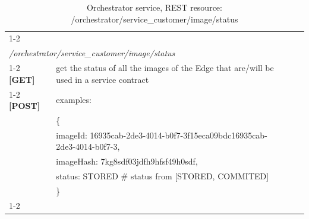 \begin{table}[H]
\centering
\begin{tabular}{|l|l|lll}
\cline{1-2}
\multicolumn{2}{|l|}{{\ul }}                                                                                   &  &  &  \\
\multicolumn{2}{|l|}{\textit{/orchestrator/service\_customer/image/status}}                                    &  &  &  \\ \cline{1-2}
\textbf{{[}GET{]}}  & get the status of all the images of the Edge that are/will be used in a service contract &  &  &  \\ \cline{1-2}
\textbf{{[}POST{]}} & examples:                                                                                &  &  &  \\
                    & \{                                                                                       &  &  &  \\
                    & imageId: 16935cab-2de3-4014-b0f7-3f15eca09bdc16935cab-2de3-4014-b0f7-3,                  &  &  &  \\
                    & imageHash: 7kg8sdf03jdfh9hfsf49h0sdf,                                               &  &  &  \\
                    & status: STORED \# status from [STORED, COMMITED]                                     &  &  &  \\
                    & \}                                                                                       &  &  &  \\ \cline{1-2}
\end{tabular}
\caption{Orchestrator service, REST resource: /orchestrator/service\_customer/image/status}
\end{table} %
